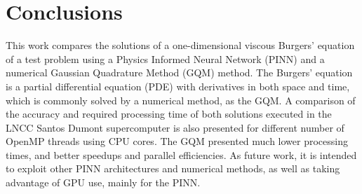 \documentclass[conference]{IEEEtran}
\begin{document}
%
\section{Conclusions}\label{sec:conc}
%
This work compares the solutions of a one-dimensional viscous Burgers’ equation of a test problem using a Physics Informed Neural Network (PINN) and a numerical Gaussian Quadrature Method (GQM) method. The Burgers' equation is a partial differential equation (PDE) with derivatives in both space and time, which is commonly solved by a numerical method, as the GQM. A comparison of the accuracy and required processing time of both solutions executed in the LNCC Santos Dumont supercomputer is also presented for different number of OpenMP threads using CPU cores. The GQM presented much lower processing times, and better speedups and parallel efficiencies. As future work, it is intended to exploit other PINN architectures and numerical methods, as well as taking advantage of GPU use, mainly for the PINN.







%
\FloatBarrier


%
\end{document}
